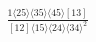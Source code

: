 \documentclass[varwidth, border=5pt]{standalone}
\begin{document}
\begin{my}
$\begin{gathered}
\scriptscriptstyle\frac{1⟨25⟩⟨35⟩⟨45⟩[13]}{[12]⟨15⟩⟨24⟩⟨34⟩^2}
\end{gathered}$
\end{my}
\end{document}
